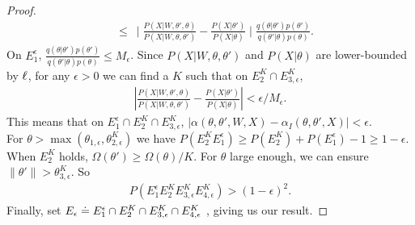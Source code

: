 \begin{proof}
\begin{align*}
& \leq \ \mid \frac{P(X | W, \theta' , \theta)}{P(X | W, \theta , \theta')} - \frac{P(X | \theta')}{P(X | \theta)}\mid  \frac{q(\theta | \theta')p(\theta')}{q(\theta' | \theta)p(\theta)}.
\end{align*}
%
On $E^\epsilon_1$, $\frac{q(\theta | \theta')p(\theta')}{q(\theta' | \theta)p(\theta)} \le M_\epsilon$.
Since ${P(X | W, \theta , \theta')}$ and ${P(X | \theta)}$
are lower-bounded by $\ell$, for any $\epsilon > 0$ we can 
find a $K$ such that on $E^K_2 \cap E^K_{3,\epsilon}$,
\begin{align*}
|\frac{P(X | W, \theta' , \theta)}{P(X | W, \theta , \theta')} - 
   \frac{P(X | \theta')}{P(X | \theta)}| < \epsilon / M_\epsilon.
\end{align*}
This means that on $E^\epsilon_1 \cap E_2^K \cap E^K_{3,\epsilon}$,
$|\alpha(\theta, \theta', W, X) - \alpha_I(\theta, \theta', X)| < \epsilon$.\\
For $\theta > \max (\theta_{1,\epsilon},\theta^K_{2,\epsilon})$ 
we have 
$
P(E^K_2 E^\epsilon_1) \ge P(E^K_2) + P(E_1^\epsilon) - 1 \ge 1 - \epsilon.
$\\
When $E^K_2$ holds, $\Omega(\theta') \ge \Omega(\theta)/K$.
For $\theta$ large enough, we can ensure $ \| \theta' \| > {\theta}^K_{3,\epsilon}$.
So \begin{align*}
P(E_1^\epsilon E_2^K E_{3,\epsilon}^K E_{4,\epsilon}^K) > (1- \epsilon)^2.
\end{align*} 
Finally, set $E_\epsilon \doteq E_1^\epsilon \cap E_2^K \cap E_{3,\epsilon}^K \cap E_{4,\epsilon}^K$ , giving us our result.


\end{proof}

